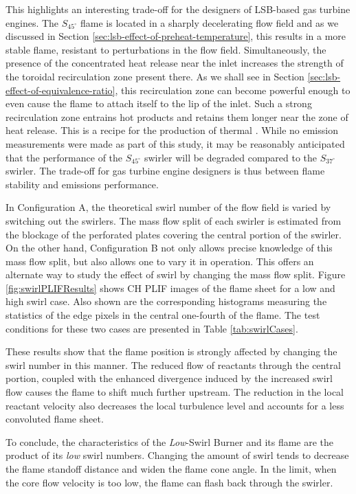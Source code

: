 This highlights an interesting trade-off for the designers of LSB-based gas turbine engines.
The \(S_{45^\circ}\) flame is located in a sharply decelerating flow field and as we discussed in Section \ref{sec:lsb-effect-of-preheat-temperature}, this results in a more stable flame, resistant to perturbations in the flow field.
Simultaneously, the presence of the concentrated heat release near the inlet increases the strength of the toroidal recirculation zone present there.
As we shall see in Section \ref{sec:lsb-effect-of-equivalence-ratio}, this recirculation zone can become powerful enough to even cause the flame to attach itself to the lip of the inlet.
Such a strong recirculation zone entrains hot products and retains them longer near the zone of heat release.
This is a recipe for the production of thermal .
While no emission measurements were made as part of this study, it may be reasonably anticipated that the  performance of the \(S_{45^\circ}\) swirler will be degraded compared to the \(S_{37^\circ}\) swirler.
The trade-off for gas turbine engine designers is thus between flame stability and emissions performance.

In Configuration A, the theoretical swirl number of the flow field is varied by switching out the swirlers.
The mass flow split of each swirler is estimated from the blockage of the perforated plates covering the central portion of the swirler.
On the other hand, Configuration B not only allows precise knowledge of this mass flow split, but also allows one to vary it in operation.
This offers an alternate way to study the effect of swirl by changing the mass flow split.
Figure \ref{fig:swirlPLIFResults} shows CH PLIF images of the flame sheet for a low and high swirl case.
Also shown are the corresponding histograms measuring the statistics of the edge pixels in the central one-fourth of the flame.
The test conditions for these two cases are presented in Table \ref{tab:swirlCases}.




These results show that the flame position is strongly affected by changing the swirl number in this manner.
The reduced flow of reactants through the central portion, coupled with the enhanced divergence induced by the increased swirl flow causes the flame to shift much further upstream.
The reduction in the local reactant velocity also decreases the local turbulence level and accounts for a less convoluted flame sheet.

To conclude, the characteristics of the \emph{Low}-Swirl Burner and its flame are the product of its \emph{low} swirl numbers.
Changing the amount of swirl tends to decrease the flame standoff distance and widen the flame cone angle.
In the limit, when the core flow velocity is too low, the flame can flash back through the swirler.

